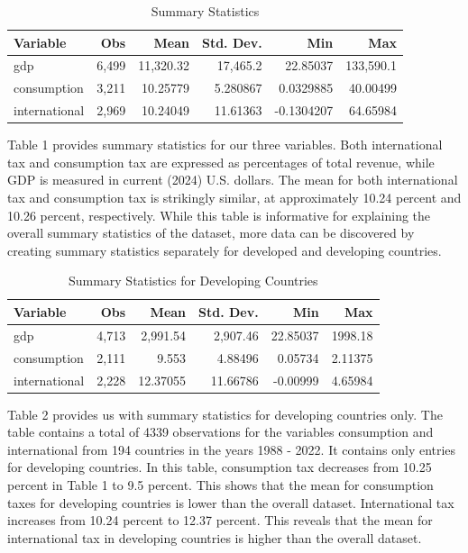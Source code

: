 \documentclass[12pt]{article}
\begin{document}
\begin{table}[h!]
\centering
\caption{Summary Statistics}
\label{tab:summary_stats}
\begin{tabular}{lrrrrr}
\hline
\textbf{Variable} & \textbf{Obs} & \textbf{Mean} & \textbf{Std. Dev.} & \textbf{Min} & \textbf{Max} \\
\hline
gdp              & 6,499        & 11,320.32     & 17,465.2           & 22.85037     & 133,590.1    \\
consumption      & 3,211        & 10.25779      & 5.280867           & 0.0329885    & 40.00499     \\
international& 2,969        & 10.24049      & 11.61363           & -0.1304207   & 64.65984     \\
\hline
\end{tabular}
\end{table}

Table 1 provides summary statistics for our three variables. Both international tax and consumption tax are expressed as percentages of total revenue, while GDP is measured in current (2024) U.S. dollars. The mean for both international tax and consumption tax is strikingly similar, at approximately 10.24 percent and 10.26 percent, respectively. While this table is informative for explaining the overall summary statistics of the dataset, more data can be discovered by creating summary statistics separately for developed and developing countries. 

\begin{table}[h!]
\centering
\caption{Summary Statistics for Developing Countries}
\label{tab:summary_stats}
\begin{tabular}{lrrrrr}
\hline
\textbf{Variable} & \textbf{Obs} & \textbf{Mean} & \textbf{Std. Dev.} & \textbf{Min} & \textbf{Max} \\
\hline
gdp              & 4,713        & 2,991.54      & 2,907.46           & 22.85037     & 1998.18      \\
consumption      & 2,111        & 9.553         & 4.88496            & 0.05734      & 2.11375      \\
international    & 2,228        & 12.37055      & 11.66786           & -0.00999     & 4.65984      \\
\hline
\end{tabular}
\end{table}
Table 2 provides us with summary statistics for developing countries only. The table contains a total of 4339 observations for the variables consumption and international from 194 countries in the years 1988 - 2022. It contains only entries for developing countries. In this table, consumption tax decreases from 10.25 percent in Table 1 to 9.5 percent. This shows that the mean for consumption taxes for developing countries is lower than the overall dataset.  International tax increases from 10.24 percent to 12.37 percent. This reveals that the mean for international tax in developing countries is higher than the overall dataset. 
\end{document}

